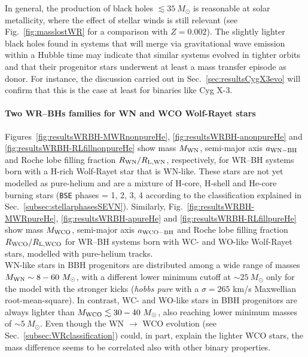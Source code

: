 \documentclass[a4paper,titlepage]{book}     	%
\newcommand{\sun}{\ensuremath{_\odot}}
\newcommand{\msun}{\ensuremath{M\sun}}
\begin{document}
In general, the production of black holes $\lesssim 35~\msun$ is reasonable at solar metallicity, where the effect of stellar winds is still relevant (see Fig.\ \ref{fig:masslostWR} for a comparison with $Z=0.002$). The slightly lighter black holes found in systems that will merge via gravitational wave emission within a Hubble time may indicate that similar systems evolved in tighter orbits and that their progenitor stars underwent at least a mass transfer episode as donor. For instance, the discussion carried out in Sec.\ \ref{sec:resultsCygX3evo} will confirm that this is the case at least for binaries like Cyg X-3.






\paragraph{Two WR--BHs families for WN and WCO Wolf-Rayet stars} Figures~\ref{fig:resultsWRBH-MWRnonpureHe}, \ref{fig:resultsWRBH-anonpureHe} and \ref{fig:resultsWRBH-RLfillnonpureHe} show mass $M_{\rm WN}$, semi-major axis $a_{\rm WN-BH}$ and Roche lobe filling fraction $R_{\rm WN}/R_{\rm L,WN}$, respectively, for WR--BH systems born with a H-rich Wolf-Rayet star that is WN-like. These stars are not yet modelled as pure-helium and are a mixture of H-core, H-shell and He-core burning stars (\texttt{BSE} phases = 1, 2, 3, 4 according to the classification explained in Sec.\ \ref{subsec:stellarphasesSEVN}). Similarly, Fig.\ \ref{fig:resultsWRBH-MWRpureHe}, \ref{fig:resultsWRBH-apureHe} and \ref{fig:resultsWRBH-RLfillpureHe} show mass $M_{\rm WCO}$, semi-major axis $a_{\rm WCO-BH}$ and Roche lobe filling fraction $R_{\rm WCO}/R_{\rm L,WCO}$ for WR--BH systems born with WC- and WO-like Wolf-Rayet stars, modelled with pure-helium tracks.\\



WN-like stars in BBH progenitors are distributed among a wide range of masses $M_{\rm WN} \sim 8-60~\msun$, with a different lower minimum cutoff at $\sim 25~\msun$ only for the model with the stronger kicks (\emph{hobbs pure} with a $\sigma=265$ km/s Maxwellian root-mean-square). In contrast, WC- and WO-like stars in BBH progenitors are always lighter than $M_{\rm WCO} \lesssim 30-40~\msun$, also reaching lower minimum masses of $\sim 5~\msun$. Even though the WN $\rightarrow$ WCO evolution (see Sec.\ \ref{subsec:WRclassification}) could, in part, explain the lighter WCO stars, the mass difference seems to be correlated also with other binary properties.
\end{document}

